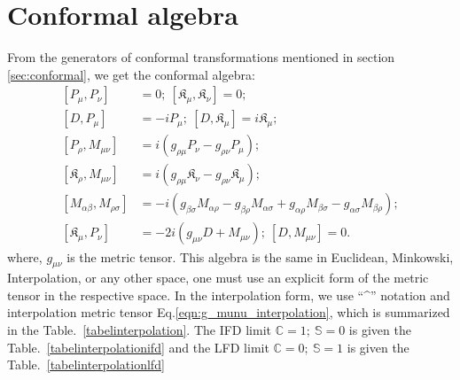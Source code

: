 \documentclass[aps,reprint,notitlepage,nofootinbib,superscriptaddress]{revtex4-1}
\begin{document}
\section{Conformal algebra}
\label{sec:appconformal}
From the generators of conformal transformations mentioned in section \ref{sec:conformal}, we get the conformal algebra:
\begin{align}\label{conformalalgebra}
    \left[P_{{\mu}},P_{{\nu}}\right]&=0;~\left[\mathfrak{K}_{{\mu}},\mathfrak{K}_{{\nu}}\right]=0;\nonumber\\
 \left[D, P_{{\mu}}\right]&=-iP_{{\mu}};~\left[D, \mathfrak{K}_{{\mu}}\right]=i\mathfrak{K}_{{\mu}};\nonumber\\
 \left[P_{{\rho}},M_{{\mu}{\nu}}\right]&=i\left(g_{{\rho}{\mu}}P_{{\nu}}-g_{{\rho}{\nu}}P_{{\mu}}\right);\nonumber\\
 \left[\mathfrak{K}_{{\rho}},M_{{\mu}{\nu}}\right]&=i\left(g_{{\rho}{\mu}}\mathfrak{K}_{{\nu}}-g_{{\rho}{\nu}}\mathfrak{K}_{{\mu}}\right);\nonumber\\
 \left[M_{{\alpha}{\beta}},M_{{\rho}{\sigma}}\right]&=-i\left(g_{{\beta}{\sigma}}M_{{\alpha}{\rho}}-g_{{\beta}{\rho}}M_{{\alpha}{\sigma}}+g_{{\alpha}{\rho}}M_{{\beta}{\sigma}}-g_{{\alpha}{\sigma}}M_{{\beta}{\rho}}\right);\nonumber\\
 \left[\mathfrak{K}_{{\mu}},P_{{\nu}}\right]&=-2i\left(g_{{\mu}{\nu}}D+M_{{\mu}{\nu}}\right);~\left[D, M_{{\mu}{\nu}}\right]=0.
\end{align} 
where, $g_{\mu\nu}$ is the metric tensor. This algebra is the same in Euclidean, Minkowski, Interpolation, or any other space, one must use an explicit form of the metric tensor in the respective space. In the interpolation form, we use ``\textasciicircum''  notation and  interpolation metric tensor Eq.\eqref{eqn:g_munu_interpolation}, which is summarized in the Table.~\ref{tabelinterpolation}. The IFD limit $\mathbb{C}=1;~\mathbb{S}=0$ is given the Table.~\ref{tabelinterpolationifd} and the LFD limit $\mathbb{C}=0;~\mathbb{S}=1$ is given the Table.~\ref{tabelinterpolationlfd}
\end{document}
